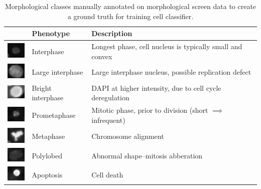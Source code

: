 \begin{table}
\begin{center}
\begin{tabular}{|l|l|p{7cm}|}
\hline
 & Phenotype & Description \\
\hline
\includegraphics[width=1cm]{img/cell_states_interphase.png} & Interphase & Longest phase, cell nucleus is typically small and convex \\
\hline
\includegraphics[width=1cm]{img/cell_states_large.png} & Large interphase & Large interphase nucleus, possible replication defect \\
\hline
\includegraphics[width=1cm]{img/cell_states_bright.png} & Bright interphase & DAPI at higher intensity, due to cell cycle deregulation \\
\hline
\includegraphics[width=1cm]{img/cell_states_prometaphase.png} & Prometaphase & Mitotic phase, prior to division (short $\implies$ infrequent) \\
\hline
\includegraphics[width=1cm]{img/cell_states_metaphase.png} & Metaphase & Chromosome alignment \\
\hline
\includegraphics[width=1cm]{img/cell_states_polylobed.png} & Polylobed & Abnormal shape--mitosis abberation \\
\hline
\includegraphics[width=1cm]{img/cell_states_apoptosis.png} & Apoptosis & Cell death \\
\hline
\end{tabular}
\caption{Morphological classes manually annotated on morphological screen data to create a ground truth for training cell classifier.}
\label{table:cell_states}
\end{center}
\end{table}

